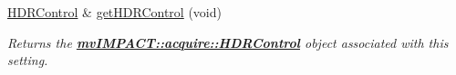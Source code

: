 \begin{DoxyCompactItemize}
\hypertarget{classmv_i_m_p_a_c_t_1_1acquire_1_1_camera_settings_blue_c_o_u_g_a_r_a8aceeb3fef3b32e5f770a83fc85b49c4}{\hyperlink{classmv_i_m_p_a_c_t_1_1acquire_1_1_h_d_r_control}{H\+D\+R\+Control} \& \hyperlink{classmv_i_m_p_a_c_t_1_1acquire_1_1_camera_settings_blue_c_o_u_g_a_r_a8aceeb3fef3b32e5f770a83fc85b49c4}{get\+H\+D\+R\+Control} (void)}\label{classmv_i_m_p_a_c_t_1_1acquire_1_1_camera_settings_blue_c_o_u_g_a_r_a8aceeb3fef3b32e5f770a83fc85b49c4}

\begin{DoxyCompactList}\small\item\em Returns the {\bfseries \hyperlink{classmv_i_m_p_a_c_t_1_1acquire_1_1_h_d_r_control}{mv\+I\+M\+P\+A\+C\+T\+::acquire\+::\+H\+D\+R\+Control}} object associated with this setting. \end{DoxyCompactList}\end{DoxyCompactItemize}

